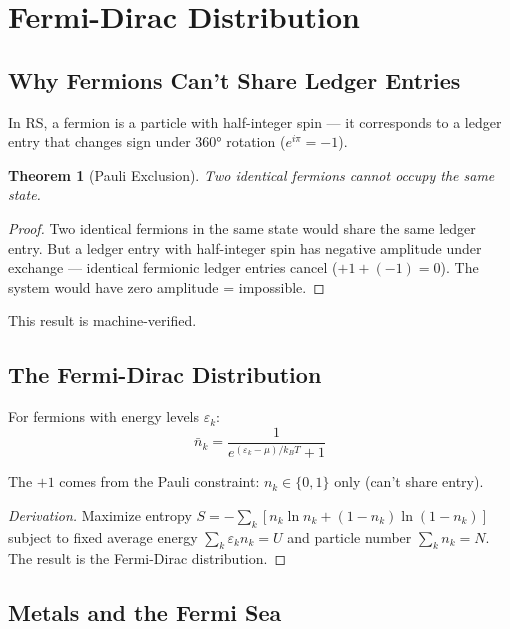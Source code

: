 \documentclass[12pt,a4paper]{article}
\newtheorem{theorem}{Theorem}[section]
\theoremstyle{definition}
\theoremstyle{remark}
\begin{document}
\section{Fermi-Dirac Distribution}

\subsection{Why Fermions Can't Share Ledger Entries}

In RS, a fermion is a particle with half-integer spin — it corresponds to a ledger 
entry that changes sign under $360°$ rotation ($e^{i\pi} = -1$).

\begin{theorem}[Pauli Exclusion]
Two identical fermions cannot occupy the same state.
\end{theorem}

\begin{proof}
Two identical fermions in the same state would share the same 
ledger entry. But a ledger entry with half-integer spin has negative amplitude under 
exchange --- identical fermionic ledger entries cancel ($+1 + (-1) = 0$). 
The system would have zero amplitude = impossible.
\end{proof}

This result is machine-verified.

\subsection{The Fermi-Dirac Distribution}

For fermions with energy levels $\varepsilon_k$:
\begin{equation}
\bar{n}_k = \frac{1}{e^{(\varepsilon_k - \mu)/k_B T} + 1}
\end{equation}

The $+1$ comes from the Pauli constraint: $n_k \in \{0, 1\}$ only (can't share entry).

\begin{proof}[Derivation]
Maximize entropy $S = -\sum_k [n_k \ln n_k + (1-n_k)\ln(1-n_k)]$ 
subject to fixed average energy $\sum_k \varepsilon_k n_k = U$ and particle number 
$\sum_k n_k = N$. The result is the Fermi-Dirac distribution.
\end{proof}

\subsection{Metals and the Fermi Sea}
\end{document}
